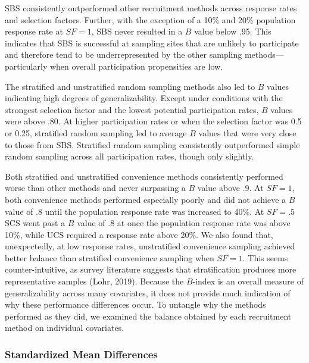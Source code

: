 \documentclass[
  english,
  man,floatsintext]{apa6}
\begin{document}
SBS consistently outperformed other recruitment methods across response rates and selection factors. Further, with the exception of a 10\% and 20\% population response rate at \(SF = 1\), SBS never resulted in a \(B\) value below .95. This indicates that SBS is successful at sampling sites that are unlikely to participate and therefore tend to be underrepresented by the other sampling methods---particularly when overall participation propensities are low.

The stratified and unstratified random sampling methods also led to \(B\) values indicating high degrees of generalizability. Except under conditions with the strongest selection factor and the lowest potential participation rates, \(B\) values were above .80. At higher participation rates or when the selection factor was 0.5 or 0.25, stratified random sampling led to average \(B\) values that were very close to those from SBS. Stratified random sampling consistently outperformed simple random sampling across all participation rates, though only slightly.

Both stratified and unstratified convenience methods consistently performed worse than other methods and never surpassing a \(B\) value above .9. At \(SF = 1\), both convenience methods performed especially poorly and did not achieve a \(B\) value of .8 until the population response rate was increased to 40\%. At \(SF = .5\) SCS went past a \(B\) value of .8 at once the population response rate was above 10\%, while UCS required a response rate above 20\%. We also found that, unexpectedly, at low response rates, unstratified convenience sampling achieved better balance than stratified convenience sampling when \(SF = 1\). This seems counter-intuitive, as survey literature suggests that stratification produces more representative samples (Lohr, 2019). Because the \(B\)-index is an overall measure of generalizability across many covariates, it does not provide much indication of why these performance differences occur. To untangle why the methods performed as they did, we examined the balance obtained by each recruitment method on individual covariates.

\hypertarget{standardized-mean-differences}{%
\subsubsection*{Standardized Mean Differences}\label{standardized-mean-differences}}
\end{document}
